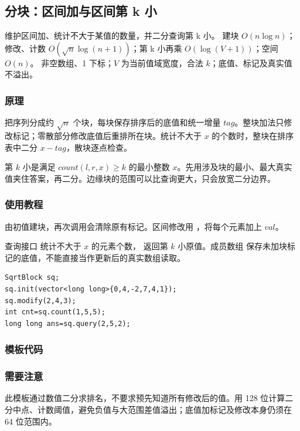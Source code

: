 \subsection{分块：区间加与区间第 k 小}
\label{ds:sqrt-block}
\AlgorithmInfo
    {维护区间加、统计不大于某值的数量，并二分查询第 k 小。}
    {建块 $O(n\log n)$；修改、计数 $O(\sqrt n\log(n+1))$；第 k 小再乘 $O(\log(V+1))$；空间 $O(n)$。}
    {非空数组、1 下标；$V$ 为当前值域宽度，合法 $k$；底值、标记及真实值不溢出。}
\subsubsection*{原理}
把序列分成约 $\sqrt n$ 个块，每块保存排序后的底值和统一增量 $tag$。整块加法只修改标记；零散部分修改底值后重排所在块。统计不大于 $x$ 的个数时，整块在排序表中二分 $x-tag$，散块逐点检查。

第 $k$ 小是满足 $count(l,r,x)\ge k$ 的最小整数 $x$。先用涉及块的最小、最大真实值夹住答案，再二分。边缘块的范围可以比查询更大，只会放宽二分边界。

\subsubsection*{使用教程}
 由初值建块，再次调用会清除原有标记。区间修改用 ，将每个元素加上 $val$。

查询接口  统计不大于 $x$ 的元素个数， 返回第 $k$ 小原值。成员数组  保存未加块标记的底值，不能直接当作更新后的真实数组读取。
\begin{lstlisting}[style=mtycpp,numbers=none]
SqrtBlock sq;
sq.init(vector<long long>{0,4,-2,7,4,1});
sq.modify(2,4,3);
int cnt=sq.count(1,5,5);
long long ans=sq.query(2,5,2);
\end{lstlisting}
\subsubsection*{模板代码}
\subsubsection*{需要注意}
此模板通过数值二分求排名，不要求预先知道所有修改后的值。用 128 位计算二分中点、计数阈值，避免负值与大范围差值溢出；底值加标记及修改本身仍须在 64 位范围内。
